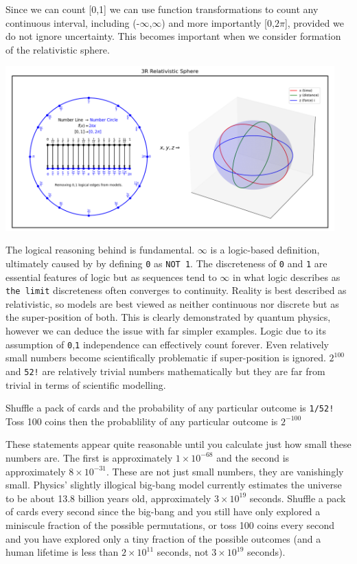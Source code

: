 \documentclass[12pt]{article}
\begin{document}
Since we can count [0,1] we can use function transformations to count any continuous interval, including (-$\infty$,$\infty$) and more importantly [0,$2\pi$], provided we do not ignore \qbit{} uncertainty. This becomes important when we consider formation of the \iR{} relativistic sphere.

\includegraphics[width=0.95\textwidth]{3Rsphere.png}

The logical reasoning behind \qbit{} is fundamental. $\infty$ is a logic-based definition, ultimately caused by by defining \texttt{0} as \texttt{NOT 1}. The discreteness of \texttt{0} and \texttt{1} are essential features of logic but as sequences tend to $\infty$ in what logic describes as \texttt{the limit} discreteness often converges to continuity. Reality is best described as relativistic, so models are best viewed as neither continuous nor discrete but as the super-position of both. This is clearly demonstrated by quantum physics, however we can deduce the issue with far simpler examples. Logic due to its assumption of \texttt{0},\texttt{1} independence can effectively count forever. Even relatively small numbers become scientifically problematic if \qbit{} super-position is ignored. $2^{100}$ and \texttt{52!} are relatively trivial numbers mathematically but they are far from trivial in terms of scientific modelling.

Shuffle a pack of cards and the probability of any particular outcome is \texttt{1/52!}
Toss 100 coins then the probablility of any particular outcome is $2^{-100}$

These statements appear quite reasonable until you calculate just how small these numbers are. The first is approximately $1 \times 10^{-68}$ and the second is approximately $8 \times 10^{-31}$. These are not just small numbers, they are vanishingly small. Physics' slightly illogical big-bang model currently estimates the universe to be about 13.8 billion years old, approximately $3 \times 10^{19}$ seconds. Shuffle a pack of cards every second since the big-bang and you still have only explored a miniscule fraction of the possible permutations, or toss 100 coins every second and you have explored only a tiny fraction of the possible outcomes (and a human lifetime is less than $2 \times 10^{11}$ seconds, not $3 \times 10^{19}$ seconds).
\end{document}
